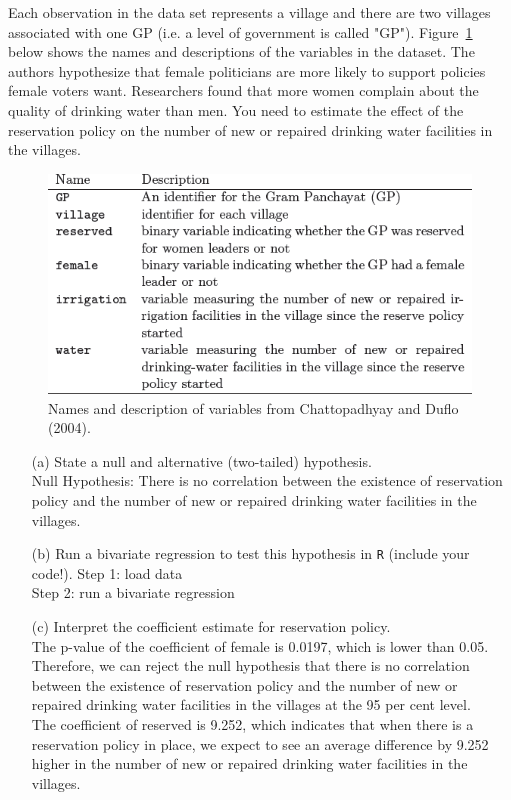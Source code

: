 \documentclass[12pt,letterpaper]{article}
\begin{document}
\noindent Each observation in the data set represents a village and there are two villages associated with one GP (i.e. a level of government is called "GP"). Figure~\ref{fig:women_desc} below shows the names and descriptions of the variables in the dataset. The authors hypothesize that female politicians are more likely to support policies female voters want. Researchers found that more women complain about the quality of drinking water than men. You need to estimate the effect of the reservation policy on the number of new or repaired drinking water facilities in the villages.
\vspace{.5cm}
\begin{figure}[h!]
	\caption{\footnotesize{Names and description of variables from Chattopadhyay and Duflo (2004).}}
	\vspace{.5cm}
	\centering
	\label{fig:women_desc}
	\includegraphics[width=1.1\textwidth]{women_desc.png}
\end{figure}		

\newpage
\begin{enumerate}
	\item [(a)] State a null and alternative (two-tailed) hypothesis. \\
	Null Hypothesis: There is no correlation between the existence of reservation policy and the number of new or repaired drinking water facilities in the villages. \\
	\vspace{6cm}
	\item [(b)] Run a bivariate regression to test this hypothesis in \texttt{R} (include your code!).
	Step 1: load data\\
	
	Step 2: run a bivariate regression
		

	
	\item [(c)] Interpret the coefficient estimate for reservation policy.\\ 
	The p-value of the coefficient of female is 0.0197, which is lower than 0.05.
	Therefore, we can reject the null hypothesis that there is no correlation between the existence of reservation policy and the number of new or repaired drinking water facilities in the villages at the 95 per cent level.\\ 
	The coefficient of reserved is 9.252, which indicates that when there is a reservation policy in place, we expect to see an average difference by 9.252 higher in the number of new or repaired drinking water facilities in the villages.
\end{enumerate}
\end{document}
